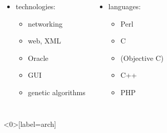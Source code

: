 \documentclass[12pt]{beamer}
\begin{document}
\begin{frame}
\smallskip

\begin{columns}[totalwidth=\linewidth]
\begin{itemize}
\item	technologies:
	\begin{itemize}
	\item	networking
	\item	web, XML
	\item	Oracle
	\item	GUI
	\item	genetic algorithms
	\end{itemize}
\end{itemize}
\begin{itemize}
\item	languages:
	\begin{itemize}
	\item	Perl
	\item	C
	\item	(Objective C)
	\item	C++
	\item	PHP
	\end{itemize}
\end{itemize}
\end{columns}
\end{frame}

%



\begin{frame}<0>[label=arch]
\centering
\begin{gv_sysarch_now}
\pause
\color{red}\pgfsetlinewidth{2bp}
\end{gv_sysarch_now}
\par
\end{frame}
\end{document}

